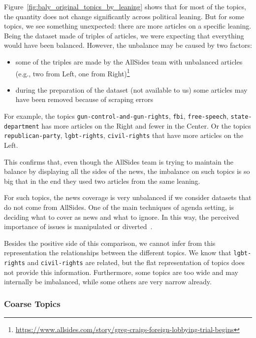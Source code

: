 Figure~\ref{fig:baly_original_topics_by_leaning} shows that for most of the topics, the quantity does not change significantly across political leaning.
But for some topics, we see something unexpected: there are more articles on a specific leaning. Being the dataset made of triples of articles, we were expecting that everything would have been balanced.
However, the unbalance may be caused by two factors:
\begin{itemize}
    \item some of the triples are made by the AllSides team with unbalanced articles (e.g., two from Left, one from Right)\footnote{\url{https://www.allsides.com/story/greg-craigs-foreign-lobbying-trial-begins}}
    \item during the preparation of the dataset (not available to us) some articles may have been removed because of scraping errors
\end{itemize}

For example, the topics \texttt{gun-control-and-gun-rights}, \texttt{fbi}, \texttt{free-speech}, \texttt{state-department} has more articles on the Right and fewer in the Center. Or the topics \texttt{republican-party}, \texttt{lgbt-rights}, \texttt{civil-rights} that have more articles on the Left.

This confirms that, even though the AllSides team is trying to maintain the balance by displaying all the sides of the news, the imbalance on such topics is so big that in the end they used two articles from the same leaning.

For such topics, the news coverage is very unbalanced if we consider datasets that do not come from AllSides.
One of the main techniques of agenda setting, is deciding what to cover as news and what to ignore. In this way, the perceived importance of issues is manipulated or diverted~\cite{mccombs1972agenda}.

Besides the positive side of this comparison, we cannot infer from this representation the relationships between the different topics.
We know that \texttt{lgbt-rights} and \texttt{civil-rights} are related, but the flat representation of topics does not provide this information.
Furthermore, some topics are too wide and may internally be imbalanced, while some others are very narrow already.

\subsubsection{\statusgreen Coarse Topics}

